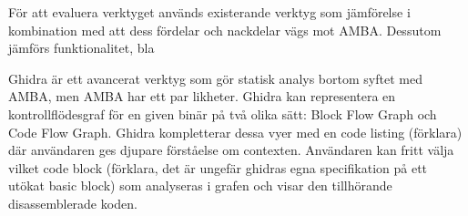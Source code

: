 



För att evaluera verktyget används existerande verktyg som jämförelse i
kombination med att dess fördelar och nackdelar vägs mot AMBA. Dessutom jämförs
funktionalitet, bla

Ghidra är ett avancerat verktyg som gör statisk analys bortom syftet med AMBA,
men AMBA har ett par likheter. Ghidra kan representera en kontrollflödesgraf för en
given binär på två olika sätt: Block Flow Graph och Code Flow Graph. Ghidra
kompletterar dessa vyer med en code listing (förklara) där användaren ges
djupare förståelse om contexten. Användaren kan fritt välja vilket code block
(förklara, det är ungefär ghidras egna specifikation på ett utökat basic
block) som analyseras i grafen och visar den tillhörande disassemblerade koden.



